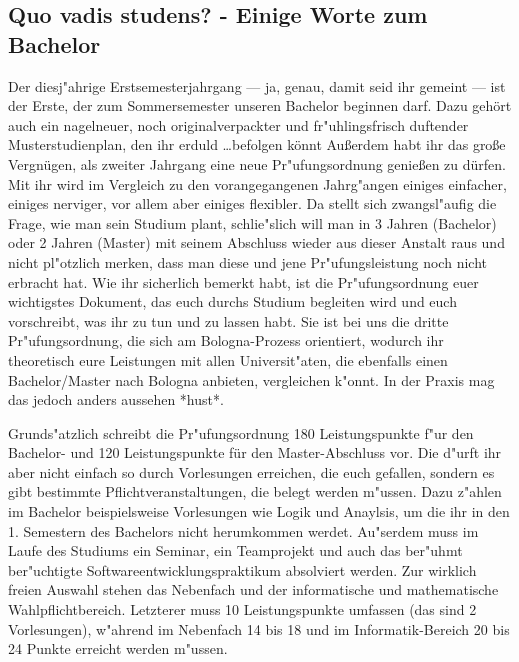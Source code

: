 \subsection{Quo vadis studens? - Einige Worte zum Bachelor}

Der diesj"ahrige Erstsemesterjahrgang --- ja, genau, damit seid ihr
gemeint --- ist der Erste, der zum Sommersemester unseren Bachelor
beginnen darf. Dazu gehört auch ein nagelneuer, noch originalverpackter
und fr"uhlingsfrisch duftender Musterstudienplan, den ihr
erduld \dots befolgen könnt%
Außerdem habt ihr das große Vergnügen, als zweiter Jahrgang eine neue 
Pr"ufungsordnung genießen zu dürfen. Mit ihr  wird im Vergleich zu den vorangegangenen
Jahrg"angen einiges einfacher, einiges nerviger, vor allem aber einiges flexibler. Da stellt sich
zwangsl"aufig die Frage, wie man sein Studium plant, schlie"slich will
man in 3 Jahren (Bachelor) oder 2 Jahren (Master) mit seinem
Abschluss wieder aus dieser Anstalt raus und nicht pl"otzlich merken, dass man diese und jene
Pr"ufungsleistung noch nicht erbracht hat.
Wie ihr sicherlich bemerkt habt, ist die Pr"ufungsordnung euer wichtigstes Dokument, das euch
durchs Studium begleiten wird und euch vorschreibt, was ihr zu tun und zu lassen habt. Sie ist bei
uns die dritte Pr"ufungsordnung, die sich am Bologna-Prozess orientiert, wodurch ihr theoretisch
eure Leistungen mit allen Universit"aten, die ebenfalls einen Bachelor/Master nach Bologna
anbieten, vergleichen k"onnt. In der Praxis mag das jedoch anders aussehen *hust*.

Grunds"atzlich schreibt die Pr"ufungsordnung 180 Leistungspunkte f"ur
den Bachelor- und 120 Leistungspunkte für den Master-Abschluss vor.
Die d"urft ihr aber nicht einfach so durch Vorlesungen erreichen, die euch gefallen, sondern es gibt
bestimmte Pflichtveranstaltungen, die belegt werden m"ussen. Dazu
z"ahlen im Bachelor beispielsweise Vorlesungen wie Logik und Anaylsis, um die
ihr in den 1. Semestern des Bachelors nicht herumkommen werdet. Au"serdem muss im Laufe des Studiums ein Seminar, ein
Teamprojekt und auch das ber"uhmt ber"uchtigte Softwareentwicklungspraktikum absolviert werden.
Zur wirklich freien Auswahl stehen das Nebenfach und der informatische und mathematische
Wahlpflichtbereich. Letzterer muss 10 Leistungspunkte umfassen (das sind 2 Vorlesungen),
w"ahrend im Nebenfach 14 bis 18 und im Informatik-Bereich 20 bis 24 Punkte erreicht werden
m"ussen.

